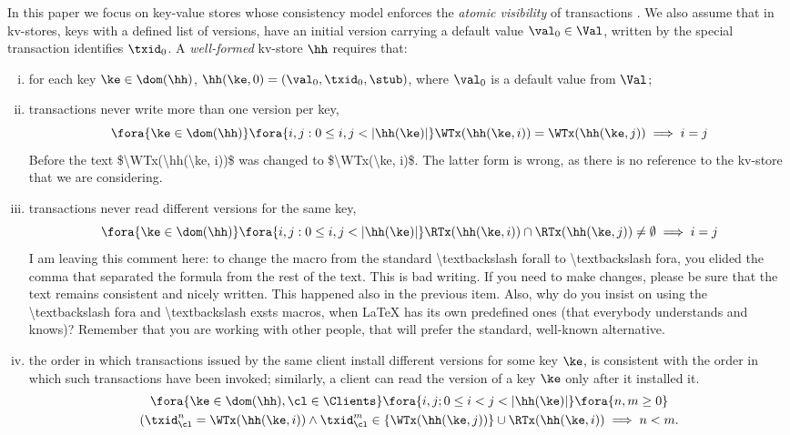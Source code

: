 In this paper we focus on key-value stores whose consistency model enforces the  
\emph{atomic visibility} of transactions \cite{framework-concur}. 
We also assume that in kv-stores, keys with a defined list of versions, have an initial version carrying  a default value $\val_0 \in \Val$, 
written by the special transaction identifies $\txid_0$.
A \emph{well-formed} kv-store $\hh$ requires that:
\begin{enumerate}[(i)]
\item\label{kv:wf.init} for each key $\ke \in \dom(\hh)$, $\hh(\ke, 0) = (\val_0, \txid_0, \stub)$, where $\val_0$ is a default value from $\Val$;
\item\label{kv:wf.onewrite} transactions never write more than one version per key,  
\[
\fora{\ke \in \dom(\hh)} \fora{ i,j : 0 \leq i, j < \lvert \hh(\ke) \rvert}
\WTx(\hh(\ke, i)) = \WTx(\hh(\ke, j)) \implies i = j \]
\ac{Before the text $\WTx(\hh(\ke, i))$ was changed to $\WTx(\ke, i)$. The latter form is wrong, 
as there is no reference to the kv-store that we are considering.}
\item\label{kv:wf.oneread} transactions never read different versions for the same key, 
\[
\fora{\ke \in \dom(\hh)} \fora{ i,j : 0 \leq i, j < \lvert \hh(\ke) \rvert} 
\RTx(\hh(\ke, i)) \cap \RTx(\hh(\ke, j)) \neq \emptyset \implies i = j
\]
\ac{I am leaving this comment here: to change the macro from the standard \textbackslash forall 
to \textbackslash fora, you elided the comma that separated the formula from the rest of the text. 
This is bad writing. If you need to make changes, please be sure that the text remains consistent 
and nicely written. This happened also in the previous item.}
\ac{Also, why do you insist on using the \textbackslash fora and \textbackslash exsts macros, when LaTeX has 
its own predefined ones (that everybody understands and knows)? Remember that you are working with other people, 
that will prefer the standard, well-known alternative.}
\item\label{kv:wf.so} the order 
in which transactions issued by the same client install different versions for some key $\ke$, is consistent with the order in which 
such transactions have been invoked; similarly, a client can read the version of a key $\ke$ only after it installed it. 
\begin{multline*}
\fora{ \ke \in \dom(\hh), \cl \in \Clients} \fora{ i,j; 0 \leq i < j < \lvert \hh(\ke) \rvert}
\fora{ n, m \geq 0}\\ (\txid_{\cl}^{n} = \WTx(\hh(\ke,i)) \wedge \txid_{\cl}^{m} \in \{\WTx(\hh(\ke,j))\} \cup \RTx(\hh(\ke, i)) \implies n < m.
\end{multline*}
\end{enumerate}
